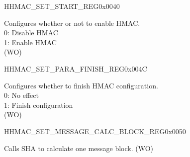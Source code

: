 \begin{register}{H}{HMAC\_SET\_START\_REG}{0x0040}\label{regdesc:HMACSETSTARTREG}
%
%
\regnewline%
\begin{regdesc}\begin{reglist}
\label{fielddesc:HMACSETSTART}\item [HMAC\_SET\_START] Configures whether or not to enable HMAC.
\\0: Disable HMAC
\\1: Enable HMAC
\\(WO)
\end{reglist}\end{regdesc}
\end{register}


\begin{register}{H}{HMAC\_SET\_PARA\_FINISH\_REG}{0x004C}\label{regdesc:HMACSETPARAFINISHREG}
%
%
\regnewline%
\begin{regdesc}\begin{reglist}
\label{fielddesc:HMACSETPARAEND}\item [HMAC\_SET\_PARA\_END] Configures whether to finish HMAC configuration.
\\0: No effect
\\1: Finish configuration
\\(WO)
\end{reglist}\end{regdesc}
\end{register}


\begin{register}{H}{HMAC\_SET\_MESSAGE\_CALC\_BLOCK\_REG}{0x0050}\label{regdesc:HMACSETMESSAGEONEREG}
%
%
\regnewline%
\begin{regdesc}\begin{reglist}
\label{fielddesc:HMACSETTEXTONE}\item [HMAC\_SET\_TEXT\_ONE] Calls SHA to calculate one message block. (WO)
\end{reglist}\end{regdesc}
\end{register}


